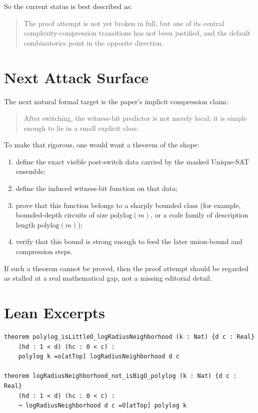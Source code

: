 \documentclass[11pt]{article}
\theoremstyle{remark}
\begin{document}
So the current status is best described as:
\begin{quote}
The proof attempt is not yet broken in full, but one of its central complexity-compression
transitions has not been justified, and the default combinatorics point in the opposite direction.
\end{quote}

\section{Next Attack Surface}

The next natural formal target is the paper's implicit compression claim:

\begin{quote}
After switching, the witness-bit predictor is not merely local; it is simple enough to lie in a
small explicit class.
\end{quote}

To make that rigorous, one would want a theorem of the shape:
\begin{enumerate}[leftmargin=1.5em]
  \item define the exact visible post-switch data carried by the masked Unique-SAT ensemble;
  \item define the induced witness-bit function on that data;
  \item prove that this function belongs to a sharply bounded class
  (for example, bounded-depth circuits of size \(\mathrm{polylog}(m)\), or a code family of
  description length \(\mathrm{polylog}(m)\));
  \item verify that this bound is strong enough to feed the later union-bound and compression steps.
\end{enumerate}

If such a theorem cannot be proved, then the proof attempt should be regarded as stalled at a real
mathematical gap, not a missing editorial detail.

\section{Lean Excerpts}

\begin{lstlisting}[caption={Core asymptotic obstruction}]
theorem polylog_isLittleO_logRadiusNeighborhood (k : Nat) {d c : Real}
    (hd : 1 < d) (hc : 0 < c) :
    polylog k =o[atTop] logRadiusNeighborhood d c

theorem logRadiusNeighborhood_not_isBigO_polylog (k : Nat) {d c : Real}
    (hd : 1 < d) (hc : 0 < c) :
    ¬ logRadiusNeighborhood d c =O[atTop] polylog k
\end{lstlisting}
\end{document}
